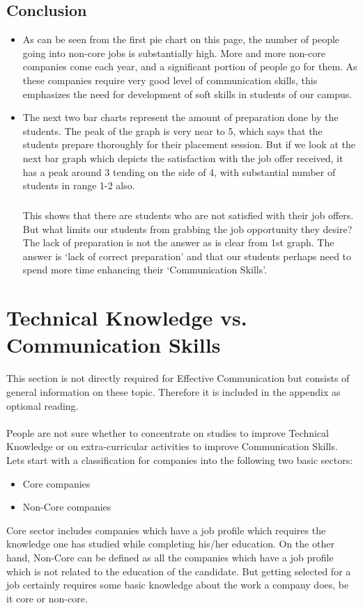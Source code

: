 \documentclass[a4paper,12pt]{report}
\begin{document}
\section{Conclusion}
\begin{itemize}
 \item As can be seen from the first pie chart on this page, the number of people going into non-core jobs is 
substantially high. More and more non-core companies come each year, and a significant portion of people go for them.
As these companies require very good level of communication skills, this emphasizes the need for development of
soft skills in students of our campus.
 \item The next two bar charts represent the amount of preparation done by the students. The peak of the graph is very 
near to 5, which says that the students prepare thoroughly for their placement session. But if we look at the next
bar graph which depicts the satisfaction with the job offer received, it has a peak around 3 tending on the side of 4,
with substantial number of students in range 1-2 also.
\paragraph{}
This shows that there are students who are not satisfied with
their job offers. But what limits our students from grabbing the job opportunity they desire? The lack of preparation is 
not the answer as is clear from 1st graph. The answer is `lack of correct preparation' and that our students perhaps need to
spend more time enhancing their `Communication Skills'.
\end{itemize}

\appendix
\chapter{Technical Knowledge vs. Communication Skills}
This section is not directly required for Effective Communication but consists of general information on
these topic. Therefore it is included in the appendix as optional reading.
\subsubsection{}
People are not sure whether to concentrate on studies to improve Technical Knowledge or on extra-curricular activities
 to improve Communication Skills. Lets start with a classification for companies into the following two basic sectors:
\begin{itemize}
 \item Core companies
 \item Non-Core companies
\end{itemize}
Core sector includes companies which have a job profile which requires the knowledge one has studied 
while completing his/her education. 
On the other hand, Non-Core can be defined as all the companies which 
have a job profile which is not related to the education of the candidate. But getting selected for a job
certainly requires some basic knowledge about the work a company does, be it core or non-core.
\end{document}
